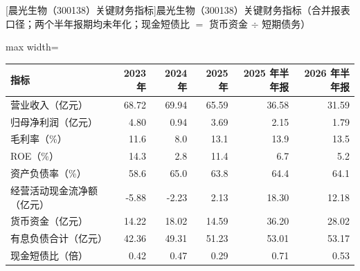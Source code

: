 \begin{center}\small\setlength{\tabcolsep}{3.4pt}
[晨光生物（300138）关键财务指标]{晨光生物（300138）关键财务指标（合并报表口径；两个半年报期均未年化；现金短债比 $=$ 货币资金 $\div$ 短期债务）}
\begin{adjustbox}{max width=\textwidth}
\begin{tabular}{@{}lrrrrr@{}}
\toprule
指标 & 2023 年 & 2024 年 & 2025 年 & 2025 年半年报 & 2026 年半年报 \\
\midrule
营业收入（亿元） & 68.72 & 69.94 & 65.59 & 36.58 & 31.59 \\
归母净利润（亿元） & 4.80 & 0.94 & 3.69 & 2.15 & 1.79 \\
毛利率（\%） & 11.6 & 8.0 & 13.1 & 13.9 & 13.5 \\
ROE（\%） & 14.3 & 2.8 & 11.4 & 6.7 & 5.2 \\
资产负债率（\%） & 58.6 & 65.0 & 63.8 & 64.4 & 64.1 \\
经营活动现金流净额（亿元） & -5.88 & -2.23 & 2.13 & 18.30 & 12.18 \\
货币资金（亿元） & 14.22 & 18.02 & 14.59 & 36.20 & 28.02 \\
有息负债合计（亿元） & 42.36 & 49.31 & 51.23 & 53.01 & 53.17 \\
现金短债比（倍） & 0.42 & 0.47 & 0.29 & 0.71 & 0.53 \\
\bottomrule
\end{tabular}
\end{adjustbox}
\end{center}

